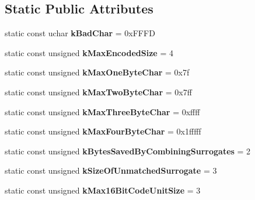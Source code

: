 \subsection*{Static Public Attributes}
\begin{DoxyCompactItemize}
\item 
static const uchar {\bfseries k\+Bad\+Char} = 0x\+F\+F\+FD\hypertarget{classunibrow_1_1_utf8_a4e5ed3c61ce8976082104caf8f6e2ff8}{}\label{classunibrow_1_1_utf8_a4e5ed3c61ce8976082104caf8f6e2ff8}

\item 
static const unsigned {\bfseries k\+Max\+Encoded\+Size} = 4\hypertarget{classunibrow_1_1_utf8_a863e13744b7f1bafb2e7cefa88db22e8}{}\label{classunibrow_1_1_utf8_a863e13744b7f1bafb2e7cefa88db22e8}

\item 
static const unsigned {\bfseries k\+Max\+One\+Byte\+Char} = 0x7f\hypertarget{classunibrow_1_1_utf8_a133ef06049e8474299fe9a84de6f2de0}{}\label{classunibrow_1_1_utf8_a133ef06049e8474299fe9a84de6f2de0}

\item 
static const unsigned {\bfseries k\+Max\+Two\+Byte\+Char} = 0x7ff\hypertarget{classunibrow_1_1_utf8_ab9ef696115d867a8a3d8e66db07d8211}{}\label{classunibrow_1_1_utf8_ab9ef696115d867a8a3d8e66db07d8211}

\item 
static const unsigned {\bfseries k\+Max\+Three\+Byte\+Char} = 0xffff\hypertarget{classunibrow_1_1_utf8_a0c0efe6dd154eaddb19bfbc7001307aa}{}\label{classunibrow_1_1_utf8_a0c0efe6dd154eaddb19bfbc7001307aa}

\item 
static const unsigned {\bfseries k\+Max\+Four\+Byte\+Char} = 0x1fffff\hypertarget{classunibrow_1_1_utf8_a7d30c60658c9742cfe77512de617a4b6}{}\label{classunibrow_1_1_utf8_a7d30c60658c9742cfe77512de617a4b6}

\item 
static const unsigned {\bfseries k\+Bytes\+Saved\+By\+Combining\+Surrogates} = 2\hypertarget{classunibrow_1_1_utf8_ad8db1cc81f7247e91d356a28392c79f9}{}\label{classunibrow_1_1_utf8_ad8db1cc81f7247e91d356a28392c79f9}

\item 
static const unsigned {\bfseries k\+Size\+Of\+Unmatched\+Surrogate} = 3\hypertarget{classunibrow_1_1_utf8_ae299e468227458f62545d61201a256eb}{}\label{classunibrow_1_1_utf8_ae299e468227458f62545d61201a256eb}

\item 
static const unsigned {\bfseries k\+Max16\+Bit\+Code\+Unit\+Size} = 3\hypertarget{classunibrow_1_1_utf8_ac950664b85f1ad13505134334f32d0c5}{}\label{classunibrow_1_1_utf8_ac950664b85f1ad13505134334f32d0c5}

\end{DoxyCompactItemize}


